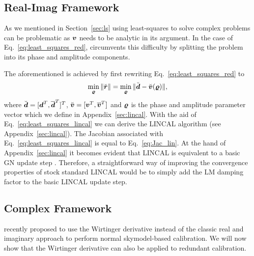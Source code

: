 \documentclass[useAMS,usenatbib]{mn2e}
\newcommand{\bz}{\bmath{z}}
\newcommand{\br}{\bmath{r}}
\newcommand{\bg}{\bmath{g}}
\newcommand{\bd}{\bmath{d}}
\newcommand{\bv}{\bmath{v}}
\newcommand{\by}{\bmath{y}}
\newcommand{\conj}[1]{\overline{#1}}
\begin{document}
\subsection{Real-Imag Framework}
\label{sec:ri}
As we mentioned in Section~\ref{sec:ls} using least-squares to solve complex problems can be problematic as $\bv$ needs to be analytic in its argument. In the case 
of Eq.~\eqref{eq:least_squares_red}, \citet{Liu2010} circumvents this difficulty by 
splitting the problem into its phase and amplitude components. 

The aforementioned is achieved by first rewriting Eq.~\eqref{eq:least_squares_red} to
\begin{equation}
\label{eq:least_squares_lincal}
\min_{\bmath{\varrho}} \|\breve{\br}\| = \min_{\bmath{\varrho}} \|\breve{\bd} - \breve{\bv}(\bmath{\varrho})\|, 
\end{equation}
where $\breve{\bd} = [\bd^T,\conj{\bd}^T]^T$, $\breve{\bv} = [\bv^T,\conj{\bv}^T]$ and $\bmath{\varrho}$ is the phase and amplitude parameter vector which we define in Appendix~\ref{sec:lincal}. 
With the aid of Eq.~\eqref{eq:least_squares_lincal} we can derive the LINCAL algorithm (see Appendix~\ref{sec:lincal}).
The Jacobian associated with Eq.~\eqref{eq:least_squares_lincal} is equal to Eq.~\eqref{eq:Jac_lin}. 
At the hand of Appendix~\ref{sec:lincal} it becomes evident that LINCAL is equivalent to a basic GN update step \citep{Kurien2016}. 
Therefore, a straightforward way of improving the convergence properties of stock standard LINCAL would be to simply add the LM damping factor to the basic LINCAL update step. 


\subsection{Complex Framework}
\label{sec:w}

\citet{Smirnov2015} recently proposed to use the Wirtinger derivative instead of the classic real and imaginary approach to perform normal skymodel-based calibration. We will now show
that the Wirtinger derivative can also be applied to redundant calibration.

\end{document}
